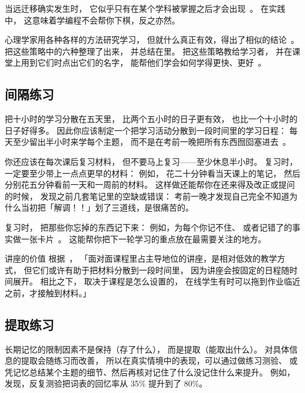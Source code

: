 当远迁移确实发生时，
它似乎只有在某个学科被掌握之后才会出现~\cite{Gick1987}。
在实践中，
这意味着学编程不会帮你下棋，反之亦然。


心理学家用各种各样的方法研究学习，
但就什么真正有效，得出了相似的结论~\cite{Mark2018}。
把这些策略中的六种整理了出来，
并总结在里。
把这些策略教给学习者，
并在课堂上用到它们时点出它们的名字，
能帮他们学会如何学得更快、更好~\cite{Wein2018a,Wein2018b}。

\subsection*{间隔练习}

把十小时的学习分散在五天里，
比两个五小时的日子更有效，
也比一个十小时的日子好得多。
因此你应该制定一个把学习活动分散到一段时间里的学习日程：
每天至少留出半小时来学每个主题，
而不是在考前一晚把所有东西囫囵塞进去~\cite{Kang2016}。

你还应该在每次课后复习材料，
但不要马上复习——至少休息半小时。
复习时，
一定要至少带上一点点更早的材料：
例如，
花二十分钟看当天课上的笔记，
然后分别花五分钟看前一天和一周前的材料。
这样做还能帮你在还来得及改正或提问的时候，
发现之前几套笔记里的空缺或错误：
考前一晚才发现自己完全不知道为什么当初把「解调！！」划了三道线，是很痛苦的。

复习时，
把那些你忘掉的东西记下来：
例如，为每个你记不住、
或者记错了的事实做一张卡片~\cite{Matt2019}。
这能帮你把下一轮学习的重点放在最需要关注的地方。

\begin{aside}{讲座的价值}
  根据~\cite{Mill2016a}，
  「面对面课程里占主导地位的讲座，是相对低效的教学方式，
  但它们或许有助于把材料分散到一段时间里，
  因为讲座会按固定的日程随时间展开。
  相比之下，
  取决于课程是怎么设置的，
  在线学生有时可以拖到作业临近之前，才接触到材料。」
\end{aside}

\subsection*{提取练习}

长期记忆的限制因素不是保持（存了什么），
而是提取（能取出什么）。
对具体信息的提取会随练习而改善，
所以在真实情境中的表现，可以通过做练习测验、
或凭记忆总结某个主题的细节、然后再核对记住了什么没记住什么来提升。
例如，
\cite{Karp2008}发现，反复测验把词表的回忆率从 35\% 提升到了 80\%。

